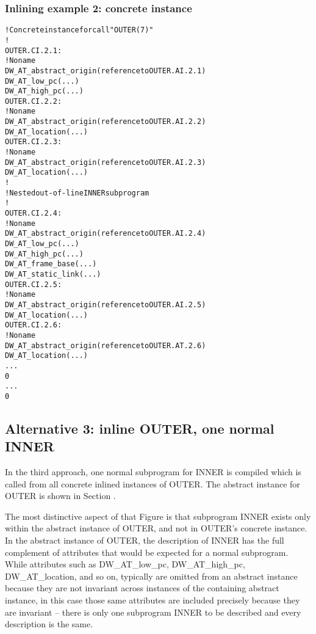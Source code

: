 \subsubsection{Inlining example 2: concrete instance}
\label{app:inliningexample2concreteinstance}
\begin{alltt}

    ! Concrete instance for call "OUTER(7)"
    !
OUTER.CI.2.1:
        ! No name
        DW\_AT\_abstract\_origin(reference to OUTER.AI.2.1)
        DW\_AT\_low\_pc(...)
        DW\_AT\_high\_pc(...)
OUTER.CI.2.2:
            ! No name
            DW\_AT\_abstract\_origin(reference to OUTER.AI.2.2)
            DW\_AT\_location(...)
OUTER.CI.2.3:
            ! No name
            DW\_AT\_abstract\_origin(reference to OUTER.AI.2.3)
            DW\_AT\_location(...)
        !
        ! Nested out-of-line INNER subprogram
        !
OUTER.CI.2.4:
            ! No name
            DW\_AT\_abstract\_origin(reference to OUTER.AI.2.4)
            DW\_AT\_low\_pc(...)
            DW\_AT\_high\_pc(...)
            DW\_AT\_frame\_base(...)
            DW\_AT\_static\_link(...)
OUTER.CI.2.5:
                ! No name
                DW\_AT\_abstract\_origin(reference to OUTER.AI.2.5)
                DW\_AT\_location(...)
OUTER.CI.2.6:
                ! No name
                DW\_AT\_abstract\_origin(reference to OUTER.AT.2.6)
                DW\_AT\_location(...)
            ...
            0
        ...
        0
\end{alltt}

\subsection{Alternative 3: inline OUTER, one normal INNER}
\label{app:inlineouteronenormalinner}

In the third approach, one normal subprogram for INNER is
compiled which is called from all concrete inlined instances of
OUTER. The abstract instance for OUTER is shown in 
Section .

The most distinctive aspect of that Figure is that subprogram
INNER exists only within the abstract instance of OUTER,
and not in OUTER’s concrete instance. In the abstract
instance of OUTER, the description of INNER has the full
complement of attributes that would be expected for a
normal subprogram. While attributes such as DW\_AT\_low\_pc,
DW\_AT\_high\_pc, DW\_AT\_location, and so on, typically are omitted
from an abstract instance because they are not invariant across
instances of the containing abstract instance, in this case
those same attributes are included precisely because they are
invariant -- there is only one subprogram INNER to be described
and every description is the same.

